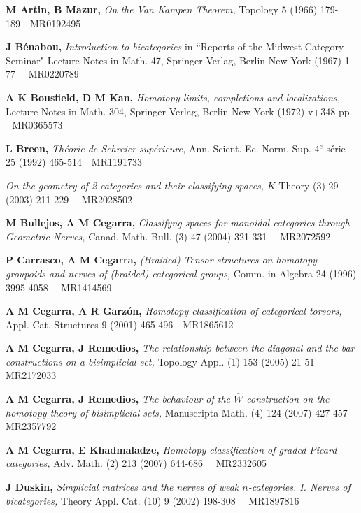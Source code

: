 \documentclass[]{amsart}
\begin{document}
\begin{thebibliography}{99}
 {\bf M Artin, B Mazur,} \emph{ On the Van Kampen Theorem,} Topology 5 (1966)
179-189\,\,\,\, MR0192495

 {\bf J B\'{e}nabou,} \emph{ Introduction to bicategories} in ``Reports of the
Midwest Category Seminar" Lecture Notes in Math. 47, Springer-Verlag, Berlin-New York (1967) 1-77
\,\,\,\, MR0220789

 {\bf A K Bousfield, D M   Kan,} \emph{ Homotopy limits, completions and localizations,}
 Lecture Notes in Math. 304, Springer-Verlag, Berlin-New York  (1972) v+348 pp. \,\,\,\,MR0365573

 {\bf L Breen,} \emph{ Th\'{e}orie de Schreier sup\'{e}rieure,}  Ann. Scient. Ec. Norm. Sup.
 4$^e$ s\'{e}rie 25 (1992) 465-514\,\,\,\, MR1191733

  \emph{ On the geometry of 2-categories and their classifying spaces,}
 $K$-Theory (3) 29 (2003) 211-229 \,\,\,\, MR2028502

 {\bf M Bullejos, A M  Cegarra,}  \emph{ Classifyng spaces for monoidal categories through Geometric
 Nerves,} Canad. Math. Bull. (3) 47 (2004) 321-331 \,\,\,\, MR2072592

 {\bf P Carrasco, A M  Cegarra,}  \emph{ (Braided) Tensor
structures on homotopy groupoids and nerves of (braided) categorical groups,} Comm. in Algebra
 24 (1996) 3995-4058 \,\,\,\, MR1414569

 {\bf A M   Cegarra, A R  Garz\'{o}n,}  \emph{ Homotopy classification of categorical torsors,}
 Appl. Cat. Structures 9 (2001) 465-496  \,\,\,\,MR1865612

 {\bf A M Cegarra, J  Remedios,}  \emph{ The relationship between the diagonal
 and the bar constructions on a bisimplicial set,} Topology Appl. (1) 153 (2005) 21-51 \,\,\,\, MR2172033

 {\bf A M Cegarra, J   Remedios,}  \emph{The behaviour of the $\overline W$-construction
on the homotopy theory of bisimplicial sets,} Manuscripta Math. (4) 124 (2007) 427-457 \,\,\,\,
MR2357792

 {\bf A M Cegarra, E  Khadmaladze,}  \emph{ Homotopy classification of graded Picard
 categories,} Adv. Math. (2) 213 (2007) 644-686 \,\,\,\, MR2332605

 {\bf J Duskin,}  \emph{Simplicial matrices and the nerves of weak $n$-categories. I.
 Nerves of bicategories,}  Theory Appl. Cat. (10) 9 (2002) 198-308 \,\,\,\, MR1897816


\end{thebibliography}
\end{document}
